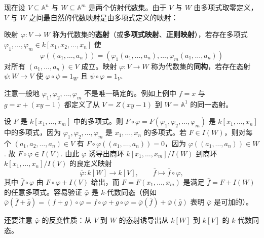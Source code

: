 现在设 \(V \subseteq \mathbb{A}^n\) 与 \(W \subseteq \mathbb{A}^m\) 是两个仿射代数集。由于 \(V\) 与 \(W\) 由多项式取零定义，\(V\) 与 \(W\) 之间最自然的代数映射是由多项式定义的映射：

\begin{definition}
映射 \(\varphi : V \to W\) 称为代数集的\textbf{态射}（或\textbf{多项式映射}、\textbf{正则映射}），若存在多项式 \(\varphi_1, \ldots, \varphi_m \in k[x_1, x_2, \ldots, x_n]\) 使
\[
\varphi((a_1, \ldots, a_n)) = (\varphi_1(a_1, \ldots, a_n), \ldots, \varphi_m(a_1, \ldots, a_n))
\]
对所有 \((a_1, \ldots, a_n) \in V\) 成立。映射 \(\varphi : V \to W\) 称为代数集的\textbf{同构}，若存在态射 \(\psi : W \to V\) 使 \(\varphi \circ \psi = 1_W\) 且 \(\psi \circ \varphi = 1_V\).
\end{definition}

注意一般地 \(\varphi_1, \varphi_2, \ldots, \varphi_m\) 不是唯一确定的。例如上例中 \(f = x\) 与 \(g = x+(xy-1)\) 都定义了从 \(V = Z(xy-1)\) 到 \(W = \mathbb{A}^1\) 的同一态射。

设 \(F\) 是 \(k[x_1, \ldots, x_m]\) 中的多项式。则 \(F \circ \varphi = F(\varphi_1, \varphi_2, \ldots, \varphi_m)\) 是 \(k[x_1, \ldots, x_n]\) 中的多项式，因为 \(\varphi_1, \varphi_2, \ldots, \varphi_m\) 是 \(x_1, \ldots, x_n\) 的多项式。若 \(F \in I(W)\)，则对每个 \((a_1, a_2, \ldots, a_n) \in V\) 有 \(F \circ \varphi((a_1, \ldots, a_n)) = 0\)，因为 \(\varphi((a_1, \ldots, a_n)) \in W\). 故 \(F \circ \varphi \in I(V)\). 由此 \(\varphi\) 诱导出商环 \(k[x_1, \ldots, x_m]/I(W)\) 到商环 \(k[x_1, \ldots, x_n]/I(V)\) 的良定义映射
\[
\bar\varphi : k[W] \to k[V], \qquad \bar f \mapsto \bar f \circ \varphi,
\]
其中 \(\bar f \circ \varphi\) 由 \(F \circ \varphi + I(V)\) 给出，而 \(F = F(x_1, \ldots, x_m)\) 是满足 \(\bar f = F+I(W)\) 的任意多项式。容易验证 \(\bar\varphi\) 是 \(k\)-代数同态（例如 \(\bar\varphi(\bar f+\bar g) = (f+g)\circ\varphi = f\circ\varphi+g\circ\varphi = \bar\varphi(\bar f)+\bar\varphi(\bar g)\) 表明 \(\bar\varphi\) 是可加的）。

还要注意 \(\bar\varphi\) 的反变性质：从 \(V\) 到 \(W\) 的态射诱导出从 \(k[W]\) 到 \(k[V]\) 的 \(k\)-代数同态。


